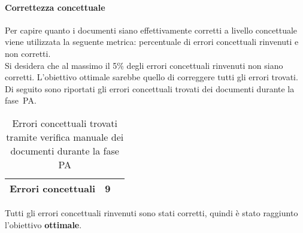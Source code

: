 \documentclass[../PianoDiQualifica.tex]{subfiles}
\begin{document}
\begin{appendices}
			\paragraph{Correttezza concettuale}
			Per capire quanto i documenti siano effettivamente corretti a livello concettuale viene utilizzata la seguente metrica: percentuale di errori concettuali rinvenuti e non corretti.\\
			Si desidera che al massimo il 5\% degli errori concettuali rinvenuti non siano corretti. L'obiettivo ottimale sarebbe quello di correggere tutti gli errori trovati. \\
			Di seguito sono riportati gli errori concettuali trovati dei documenti durante la fase\g\ PA.
			\begin{table}[H]
				\centering
				\begin{tabular}{l * {2}{c}}
					\midrule
					Errori concettuali & 9 \\
					\midrule
				\end{tabular}
				\caption{Errori concettuali trovati tramite verifica manuale dei documenti durante la fase PA}
				\label{tab:errori_concettuali}
			\end{table}
			Tutti gli errori concettuali rinvenuti sono stati corretti, quindi è stato raggiunto l'obiettivo \textbf{ottimale}.
			
\end{appendices}
\end{document}
